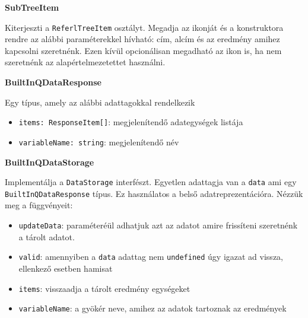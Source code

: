 \vspace{14pt}
\noindent \textbf{SubTreeItem}


\noindent Kiterjeszti a \lstinline{ReferlTreeItem} osztályt. Megadja az ikonját és a konstruktora rendre az alábbi paraméterekkel hívható: cím, alcím és az eredmény amihez kapcsolni szeretnénk. Ezen kívül opcionálisan megadható az ikon is, ha nem szeretnénk az alapértelmezetettet használni.






\vspace{14pt}
\noindent \textbf{BuiltInQDataResponse}



\noindent Egy típus, amely az alábbi adattagokkal rendelkezik

\begin{itemize}
    \item \lstinline{items: ResponseItem[]}: megjelenítendő adategységek listája
    
    \item \lstinline{variableName: string}: megjelenítendő név 
\end{itemize}




\vspace{14pt}
\noindent \textbf{BuiltInQDataStorage}


\noindent Implementálja a \lstinline{DataStorage} interfészt. Egyetlen adattagja van a \lstinline{data} ami egy \lstinline{BuiltInQDataResponse} típus. Ez használatos a belső adatreprezentációra. Nézzük meg a függvényeit:

\begin{itemize}
    \item \lstinline{updateData}: paraméteréül adhatjuk azt az adatot amire frissíteni szeretnénk a tárolt adatot.
    
    \item \lstinline{valid}: amennyiben a \lstinline{data} adattag nem \lstinline{undefined} úgy igazat ad vissza, ellenkező esetben hamisat
    
    \item \lstinline{items}: visszaadja a tárolt eredmény egységeket
    
    \item \lstinline{variableName}: a gyökér neve, amihez az adatok tartoznak az eredmények
    
    
\end{itemize}







